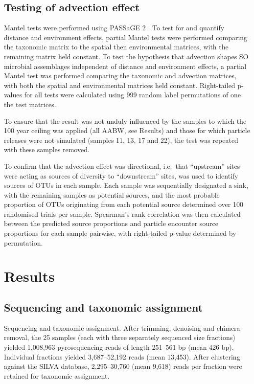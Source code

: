 \subsection{Testing of advection effect}

Mantel tests were performed using \ac{PASSaGE 2} \cite{Rosenberg:2011uz}.
To test for and quantify distance and environment effects, partial Mantel tests were performed comparing the taxonomic matrix to the spatial then environmental matrices, with the remaining matrix held constant.
To test the hypothesis that advection shapes \ac{SO} microbial assemblages independent of distance and environment effects, a partial Mantel test was performed comparing the taxonomic and advection matrices, with both the spatial and environmental matrices held constant.
Right-tailed p-values for all tests were calculated using 999 random label permutations of one the test matrices.

To ensure that the result was not unduly influenced by the samples to which the 100 year ceiling was applied (all \ac{AABW}, see Results) and those for which particle releases were not simulated (samples 11, 13, 17 and 22), the test was repeated with these samples removed.

To confirm that the advection effect was directional, i.e.\ that ``upstream'' sites were acting as sources of diversity to ``downstream'' sites,  \cite{Knights:2011in} was used to identify sources of \acp{OTU} in each sample.
Each sample was sequentially designated a sink, with the remaining samples as potential sources, and the most probable proportion of \acp{OTU} originating from each potential source determined over 100 randomised trials per sample.
Spearman's rank correlation was then calculated between the  predicted source proportions and particle encounter source proportions for each sample pairwise, with right-tailed p-value determined by permutation.

\section{Results}

\subsection{Sequencing and taxonomic assignment}


Sequencing and taxonomic assignment.
After trimming, denoising and chimera removal, the 25 samples (each with three separately sequenced size fractions) yielded 1,008,963 pyrosequencing reads of length 251--561 bp (mean 426 bp).
Individual fractions yielded 3,687--52,192 reads (mean 13,453).
After clustering against the SILVA database, 2,295--30,760 (mean 9,618) reads per fraction were retained for taxonomic assignment.

